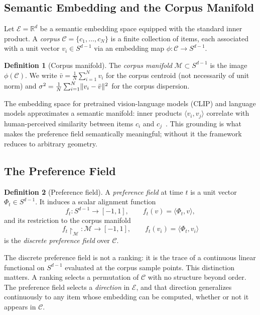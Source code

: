\documentclass[12pt, a4paper]{article}
\DeclarePairedDelimiter{\norm}{\lVert}{\rVert}
\theoremstyle{plain}
\theoremstyle{definition}
\newtheorem{definition}{Definition}[section]
\begin{document}
\subsection{Semantic Embedding and the Corpus Manifold}

Let $\mathcal{E} = \mathbb{R}^d$ be a semantic embedding space equipped with
the standard inner product. A \textit{corpus} $\mathcal{C} = \{c_1, \ldots,
c_N\}$ is a finite collection of items, each associated with a unit vector
$v_i \in S^{d-1}$ via an embedding map $\phi : \mathcal{C} \to S^{d-1}$.

\begin{definition}[Corpus manifold]
The \emph{corpus manifold} $\mathcal{M} \subset S^{d-1}$ is the image
$\phi(\mathcal{C})$. We write $\bar{v} = \frac{1}{N}\sum_{i=1}^N v_i$ for the
corpus centroid (not necessarily of unit norm) and
$\sigma^2 = \frac{1}{N}\sum_{i=1}^N \norm{v_i - \bar{v}}^2$ for the
corpus dispersion.
\end{definition}

The embedding space for pretrained vision-language models (CLIP) and language
models approximates a semantic manifold: inner products $\langle v_i, v_j
\rangle$ correlate with human-perceived similarity between items $c_i$ and
$c_j$~\cite{radford2021clip}. This grounding is what makes the preference
field semantically meaningful; without it the framework reduces to arbitrary
geometry.

\subsection{The Preference Field}

\begin{definition}[Preference field]
A \emph{preference field} at time $t$ is a unit vector $\Phi_t \in S^{d-1}$.
It induces a scalar alignment function
\begin{equation}
  f_t : S^{d-1} \to [-1, 1], \qquad f_t(v) = \langle \Phi_t, v \rangle,
\end{equation}
and its restriction to the corpus manifold
\begin{equation}
  f_t\!\restriction_{\mathcal{M}} : \mathcal{M} \to [-1, 1], \qquad
  f_t(v_i) = \langle \Phi_t, v_i \rangle
\end{equation}
is the \emph{discrete preference field} over $\mathcal{C}$.
\end{definition}

The discrete preference field is not a ranking: it is the trace of a continuous
linear functional on $S^{d-1}$ evaluated at the corpus sample points. This
distinction matters. A ranking selects a permutation of $\mathcal{C}$ with no
structure beyond order. The preference field selects a \textit{direction} in
$\mathcal{E}$, and that direction generalizes continuously to any item whose
embedding can be computed, whether or not it appears in $\mathcal{C}$.
\end{document}
